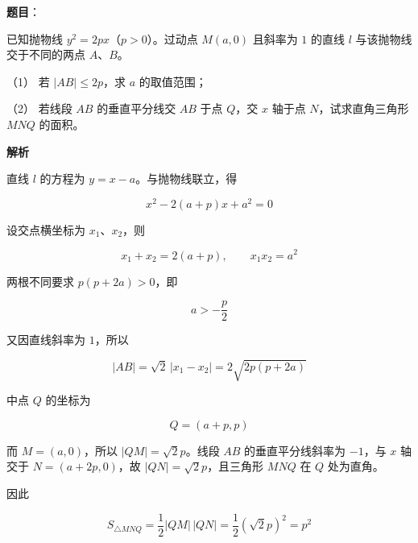 \begin{answer}

\textbf{题目}：

已知抛物线 $y^2=2px$（$p>0$）。过动点 $M(a,0)$ 且斜率为 $1$ 的直线 $l$ 与该抛物线交于不同的两点 $A\text{、}B$。

（1） 若 $|AB|\le2p$，求 $a$ 的取值范围；

（2） 若线段 $AB$ 的垂直平分线交 $AB$ 于点 $Q$，交 $x$ 轴于点 $N$，试求直角三角形 $MNQ$ 的面积。

\textbf{解析}


直线 $l$ 的方程为 $y=x-a$。与抛物线联立，得

\nopagebreak[4]
\[
x^2-2(a+p)x+a^2=0
\]

设交点横坐标为 $x_1\text{、}x_2$，则

\nopagebreak[4]
\[
x_1+x_2=2(a+p),\qquad x_1x_2=a^2
\]

两根不同要求 $p(p+2a)>0$，即

\nopagebreak[4]
\[
a>-\frac p2
\]

又因直线斜率为 $1$，所以

\nopagebreak[4]
\[
|AB|=\sqrt2\,|x_1-x_2|
=2\sqrt{2p(p+2a)}
\]

中点 $Q$ 的坐标为

\nopagebreak[4]
\[
Q=(a+p,p)
\]


而 $M=(a,0)$，所以 $|QM|=\sqrt2p$。线段 $AB$ 的垂直平分线斜率为 $-1$，与 $x$ 轴交于 $N=(a+2p,0)$，故 $|QN|=\sqrt2p$，且三角形 $MNQ$ 在 $Q$ 处为直角。

因此

\nopagebreak[4]
\[
S_{\triangle MNQ}
=\frac12|QM|\,|QN|
=\frac12(\sqrt2p)^2
=p^2
\]



\end{answer}